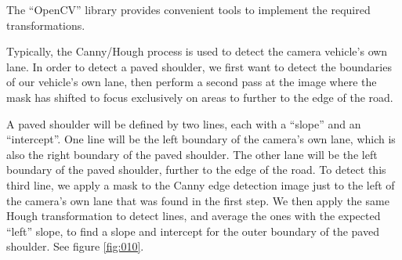 \documentclass[11pt,twoside]{report}
\begin{document}
The ``OpenCV'' library provides convenient tools to implement the required transformations.

Typically, the Canny/Hough process is used to detect the camera vehicle's own lane.  In order to detect a paved shoulder, we first want to detect the boundaries of our vehicle's own lane, then perform a second pass at the image where the mask has shifted to focus exclusively on areas to further to the edge of the road.

A paved shoulder will be defined by two lines, each with a ``slope'' and an ``intercept''.  One line will be the left boundary of the camera's own lane, which is also the right boundary of the paved shoulder.  The other lane will be the left boundary of the paved shoulder, further to the edge of the road.  To detect this third line, we apply a mask to the Canny edge detection image just to the left of the camera's own lane that was found in the first step.  We then apply the same Hough transformation to detect lines, and average the ones with the expected ``left'' slope, to find a slope and intercept for the outer boundary of the paved shoulder.  See figure \ref{fig:010}.
\end{document}
